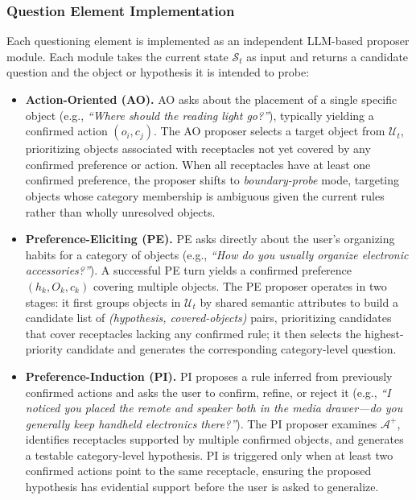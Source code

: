 \documentclass[manuscript,review,anonymous]{acmart}
\begin{document}
{\subsubsection{Question Element Implementation}
\label{sec:question-elements}

Each questioning element is implemented as an independent LLM-based proposer module. Each module takes the current state $\mathcal{S}_t$ as input and returns a candidate question and the object or hypothesis it is intended to probe:

\begin{itemize}[leftmargin=*]
    \item \textbf{Action-Oriented (AO).} AO asks about the placement of a single specific object (e.g., \textit{``Where should the reading light go?''}), typically yielding a confirmed action $(o_i, c_j)$. The AO proposer selects a target object from $\mathcal{U}_t$, prioritizing objects associated with receptacles not yet covered by any confirmed preference or action. When all receptacles have at least one confirmed preference, the proposer shifts to \textit{boundary-probe} mode, targeting objects whose category membership is ambiguous given the current rules rather than wholly unresolved objects.
    \item \textbf{Preference-Eliciting (PE).} PE asks directly about the user's organizing habits for a category of objects (e.g., \textit{``How do you usually organize electronic accessories?''}). A successful PE turn yields a confirmed preference $(h_k, O_k, c_k)$ covering multiple objects. The PE proposer operates in two stages: it first groups objects in $\mathcal{U}_t$ by shared semantic attributes to build a candidate list of \textit{(hypothesis, covered-objects)} pairs, prioritizing candidates that cover receptacles lacking any confirmed rule; it then selects the highest-priority candidate and generates the corresponding category-level question.
    \item \textbf{Preference-Induction (PI).} PI proposes a rule inferred from previously confirmed actions and asks the user to confirm, refine, or reject it (e.g., \textit{``I noticed you placed the remote and speaker both in the media drawer---do you generally keep handheld electronics there?''}). The PI proposer examines $\mathcal{A}^+$, identifies receptacles supported by multiple confirmed objects, and generates a testable category-level hypothesis. PI is triggered only when at least two confirmed actions point to the same receptacle, ensuring the proposed hypothesis has evidential support before the user is asked to generalize.
\end{itemize}

}
\end{document}
